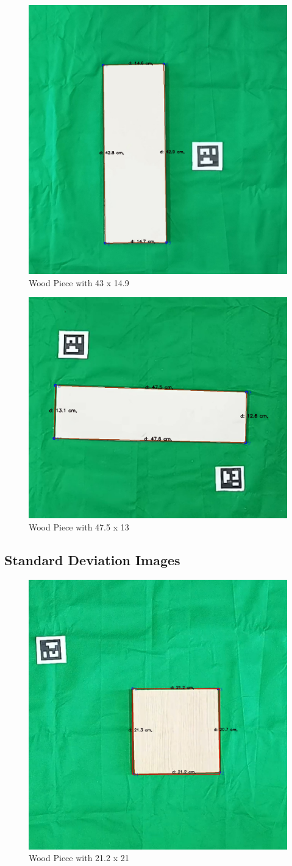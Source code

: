 \begin{figure}[H]
    \centering
    \includegraphics[width=0.35\linewidth]{images/Systematic/43x14.9.png}
    \caption{Wood Piece with 43 x 14.9}
    \label{fig:enter-label}
\end{figure}


\begin{figure}[H]
    \centering
    \includegraphics[width=0.35\linewidth]{images/Systematic/47.5x13.png}
    \caption{Wood Piece with 47.5 x 13}
    \label{fig:enter-label}
\end{figure}



\subsection{Standard Deviation Images}

\begin{figure}[!h]
    \centering
    \includegraphics[width=0.35\linewidth]{images/Normal Dist/21.2x21_1.png}
    \caption{Wood Piece with 21.2 x 21}
    \label{fig:enter-label}
\end{figure}

